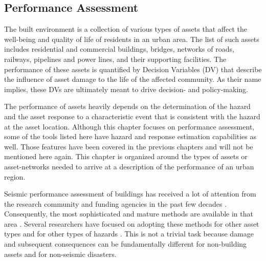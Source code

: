 
\begin{partbacktext}
\part{Performance Assessment}\label{part:Performance}

The built environment is a collection of various types of assets that affect the well-being and quality of life of residents in an urban area. The list of such assets includes residential and commercial buildings, bridges, networks of roads, railways, pipelines and power lines, and their supporting facilities. The performance of these assets is quantified by Decision Variables (DV) that describe the influence of asset damage to the life of the affected community. As their name implies, these DVs are ultimately meant to drive decision- and policy-making.

The performance of assets heavily depends on the determination of the hazard and the asset response to a characteristic event that is consistent with the hazard at the asset location. Although this chapter focuses on performance assessment, some of the tools listed here have hazard and response estimation capabilities as well. Those features have been covered in the previous chapters and will not be mentioned here again. This chapter is organized around the types of assets or asset-networks needed to arrive at a description of the performance of an urban region. 

    Seismic performance assessment of buildings has received a lot of attention from the research community and funding agencies in the past few decades \citep{atc1985atc13, fema2011earthquaketechnical, fema2011hurricanetechnical, fajfar2004performancebased, atc2012p-58}. Consequently, the most sophisticated and mature methods are available in that area \citep{atc2012p-58}. Several researchers have focused on adopting these methods for other asset types \citep{werner2006redars, chmielewski2016response} and for other types of hazards \citep{fema2011hurricanetechnical, attary2017performancebased, barbato2013performancebased, lange2014application}. This is not a trivial task because damage and subsequent consequences can be fundamentally different for non-building assets and for non-seismic disasters.  

\end{partbacktext}
